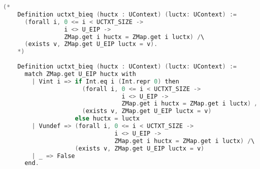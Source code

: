 \begin{lstlisting}[language=C]
    (*
    Definition uctxt_bieq (huctx : UContext) (luctx: UContext) :=
      (forall i, 0 <= i < UCTXT_SIZE -> 
                 i <> U_EIP ->
                 ZMap.get i huctx = ZMap.get i luctx) /\ 
      (exists v, ZMap.get U_EIP luctx = v).
    *)
      
    Definition uctxt_bieq (huctx : UContext) (luctx: UContext) :=
      match ZMap.get U_EIP huctx with 
        | Vint i => if Int.eq i (Int.repr 0) then 
                      (forall i, 0 <= i < UCTXT_SIZE -> 
                                 i <> U_EIP ->
                                 ZMap.get i huctx = ZMap.get i luctx) /\ 
                      (exists v, ZMap.get U_EIP luctx = v)
                    else huctx = luctx
        | Vundef => (forall i, 0 <= i < UCTXT_SIZE -> 
                               i <> U_EIP ->
                               ZMap.get i huctx = ZMap.get i luctx) /\ 
                    (exists v, ZMap.get U_EIP luctx = v)
        | _ => False
      end.


\end{lstlisting}
